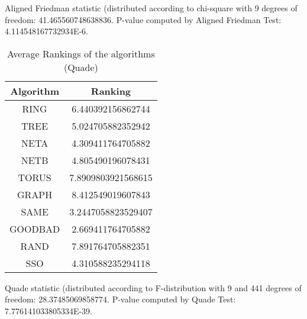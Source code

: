 \documentclass[a4paper,10pt]{article}
\begin{document}
\begin{landscape}
Aligned Friedman statistic (distributed according to chi-square with 9 degrees of freedom: 41.465560748638836. 
P-value computed by Aligned Friedman Test: 4.114548167732934E-6.\newline


\newpage

\begin{table}[!htp]
\centering
\caption{Average Rankings of the algorithms (Quade)
}\begin{tabular}{c|c}
Algorithm&Ranking\\
\hline
 RING&6.440392156862744\\
 TREE&5.024705882352942\\
 NETA&4.309411764705882\\
 NETB&4.805490196078431\\
 TORUS&7.8909803921568615\\
 GRAPH&8.412549019607843\\
 SAME&3.2447058823529407\\
 GOODBAD&2.669411764705882\\
 RAND&7.891764705882351\\
 SSO&4.310588235294118\\
\end{tabular}
\end{table}
Quade statistic (distributed according to F-distribution with 9 and 441 degrees of freedom: 28.37485069858774. 
P-value computed by Quade Test: 7.776141033805334E-39.\newline


\newpage


\end{landscape}
\end{document}
